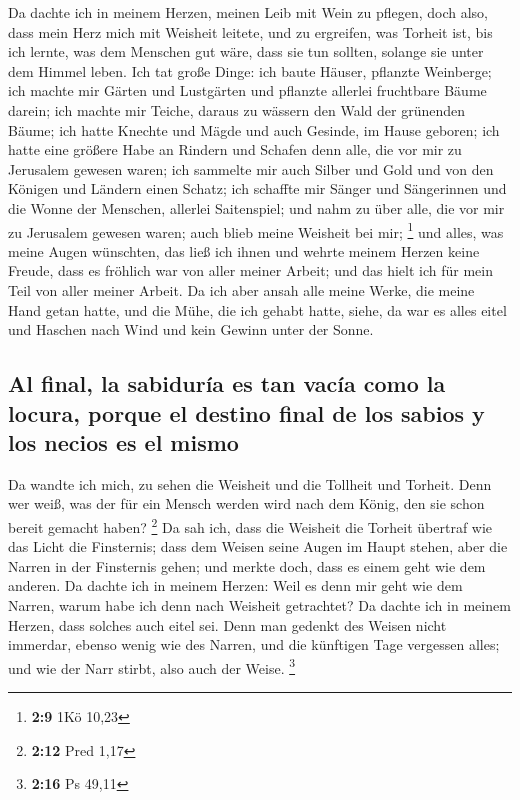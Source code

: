  Da dachte ich in meinem Herzen, meinen Leib mit Wein zu
pflegen, doch also, dass mein Herz mich mit Weisheit leitete, und zu
ergreifen, was Torheit ist, bis ich lernte, was dem Menschen gut wäre,
dass sie tun sollten, solange sie unter dem Himmel leben. 
Ich tat große Dinge: ich baute Häuser, pflanzte Weinberge;
 ich machte mir Gärten und Lustgärten und pflanzte
allerlei fruchtbare Bäume darein;  ich machte mir Teiche,
daraus zu wässern den Wald der grünenden Bäume;  ich hatte
Knechte und Mägde und auch Gesinde, im Hause geboren; ich hatte eine
größere Habe an Rindern und Schafen denn alle, die vor mir zu Jerusalem
gewesen waren;  ich sammelte mir auch Silber und Gold und
von den Königen und Ländern einen Schatz; ich schaffte mir Sänger und
Sängerinnen und die Wonne der Menschen, allerlei Saitenspiel;
 und nahm zu über alle, die vor mir zu Jerusalem gewesen
waren; auch blieb meine Weisheit bei mir; \footnote{\textbf{2:9} 1Kö
  10,23}  und alles, was meine Augen wünschten, das ließ
ich ihnen und wehrte meinem Herzen keine Freude, dass es fröhlich war
von aller meiner Arbeit; und das hielt ich für mein Teil von aller
meiner Arbeit.  Da ich aber ansah alle meine Werke, die
meine Hand getan hatte, und die Mühe, die ich gehabt hatte, siehe, da
war es alles eitel und Haschen nach Wind und kein Gewinn unter der
Sonne.

\hypertarget{al-final-la-sabiduruxeda-es-tan-vacuxeda-como-la-locura-porque-el-destino-final-de-los-sabios-y-los-necios-es-el-mismo}{%
\subsection{Al final, la sabiduría es tan vacía como la locura, porque
el destino final de los sabios y los necios es el
mismo}\label{al-final-la-sabiduruxeda-es-tan-vacuxeda-como-la-locura-porque-el-destino-final-de-los-sabios-y-los-necios-es-el-mismo}}

 Da wandte ich mich, zu sehen die Weisheit und die
Tollheit und Torheit. Denn wer weiß, was der für ein Mensch werden wird
nach dem König, den sie schon bereit gemacht haben? \footnote{\textbf{2:12}
  Pred 1,17}  Da sah ich, dass die Weisheit die Torheit
übertraf wie das Licht die Finsternis;  dass dem Weisen
seine Augen im Haupt stehen, aber die Narren in der Finsternis gehen;
und merkte doch, dass es einem geht wie dem anderen.  Da
dachte ich in meinem Herzen: Weil es denn mir geht wie dem Narren, warum
habe ich denn nach Weisheit getrachtet? Da dachte ich in meinem Herzen,
dass solches auch eitel sei.  Denn man gedenkt des Weisen
nicht immerdar, ebenso wenig wie des Narren, und die künftigen Tage
vergessen alles; und wie der Narr stirbt, also auch der Weise.
\footnote{\textbf{2:16} Ps 49,11}

